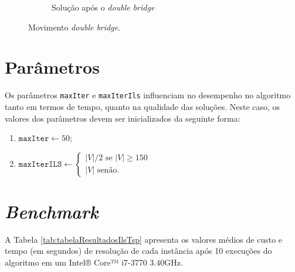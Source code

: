 \begin{figure}[t]
\begin{subfigure}[b]{0.4\textwidth}
        \caption{Solução após o \textit{double bridge}}
        \label{fig:aposDoubleBridge}
    \end{subfigure}
    
        \caption{Movimento \textit{double bridge}.}
        \label{fig:doubleBridge}

\end{figure}
\fi


\section{Parâmetros}
Os parâmetros \texttt{maxIter} e \texttt{maxIterIls} influenciam no desempenho no algoritmo tanto em termos de tempo, quanto na qualidade das soluções. Neste caso, os valores dos parâmetros devem ser inicializados da seguinte forma:
\begin{enumerate}
    \item \(\texttt{maxIter} \gets 50\);
    \item \(\texttt{maxIterILS} \gets \begin{cases}{|V|/2} \text{ se } |V| \geq 150 \\
            |V| \text{ senão}.
            \end{cases}\)
\end{enumerate}

\section{\textit{Benchmark}}

A Tabela \ref{tab:tabelaResultadosIlsTsp} apresenta os valores médios de custo e tempo (em segundos) de resolução de cada instância após 10 execuções do algoritmo em um Intel® Core™ i7-3770 3.40GHz.

